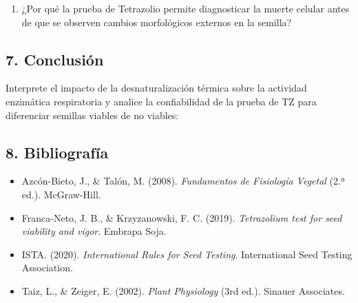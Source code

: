 \documentclass[
  spanish,
  10pt,
  letterpaper,
  twocolumn]{article}
\providecommand{\tightlist}{%
  \setlength{\itemsep}{0pt}\setlength{\parskip}{0pt}}
\begin{document}
\hrulefill

\hrulefill

\hrulefill

\hrulefill

\hrulefill

\hrulefill

\hrulefill

\begin{enumerate}
\def\labelenumi{\arabic{enumi}.}
\setcounter{enumi}{2}
\tightlist
\item
  ¿Por qué la prueba de Tetrazolio permite diagnosticar la muerte
  celular antes de que se observen cambios morfológicos externos en la
  semilla?
\end{enumerate}

\hrulefill

\hrulefill

\hrulefill

\hrulefill

\hrulefill

\hrulefill

\hrulefill

\subsection{7. Conclusión}\label{conclusiuxf3n}

Interprete el impacto de la desnaturalización térmica sobre la actividad
enzimática respiratoria y analice la confiabilidad de la prueba de TZ
para diferenciar semillas viables de no viables:

\hrulefill

\hrulefill

\hrulefill

\hrulefill

\hrulefill

\hrulefill

\subsection{8. Bibliografía}\label{bibliografuxeda}

\begin{itemize}
\tightlist
\item
  Azcón-Bieto, J., \& Talón, M. (2008). \emph{Fundamentos de Fisiología
  Vegetal} (2.ª ed.). McGraw-Hill.
\item
  Franca-Neto, J. B., \& Krzyzanowski, F. C. (2019). \emph{Tetrazolium
  test for seed viability and vigor}. Embrapa Soja.
\item
  ISTA. (2020). \emph{International Rules for Seed Testing}.
  International Seed Testing Association.
\item
  Taiz, L., \& Zeiger, E. (2002). \emph{Plant Physiology} (3rd ed.).
  Sinauer Associates.
\end{itemize}
\end{document}
